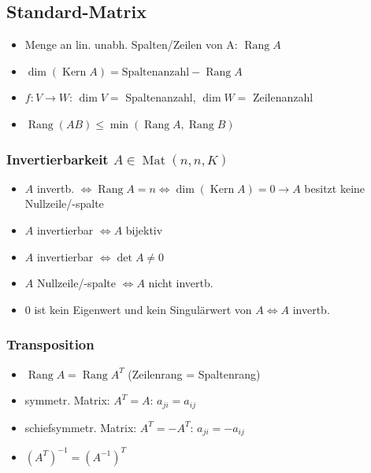 \documentclass[german, fourcolumn, 8pt]{latex4ei/latex4ei_sheet}
\newcommand{\equival}[0]{\ensuremath{\Longleftrightarrow}}
\DeclareMathOperator{\Rang}{Rang}
\DeclareMathOperator{\Kern}{Kern}
\begin{document}
\begin{sectionbox}
    \subsection{Standard-Matrix}
    \begin{itemize}
        \item Menge an lin. unabh. Spalten/Zeilen von A: $\Rang A$
        \item $\dim(\Kern A)= \text{Spaltenanzahl} - \Rang A$
        \item $f: V \rightarrow W$: $\dim V=$ Spaltenanzahl, $\dim W=$ Zeilenanzahl
        \item $\Rang(AB) \le \min(\Rang A, \Rang B)$
    \end{itemize}

    \subsubsection{Invertierbarkeit $A \in \operatorname{Mat}(n,n,K)$}
    \begin{itemize}
        \item $A$ invertb. $\equival \Rang A = n \equival \dim(\Kern A) = 0 \rightarrow A$ besitzt keine Nullzeile/-spalte
        \item $A$ invertierbar $\equival A$ bijektiv
        \item $A$ invertierbar $\equival \det A \ne 0$
        \item $A$ Nullzeile/-spalte $\equival A$ nicht invertb.
        \item $0$ ist kein Eigenwert und kein Singulärwert von $A \equival A$ invertb.
    \end{itemize}

    \subsubsection{Transposition}
    \begin{itemize}
        \item $\Rang A=\Rang A^T$ (Zeilenrang = Spaltenrang)
        \item symmetr. Matrix: $A^T=A$: $a_{ji}=a_{ij}$
        \item schiefsymmetr. Matrix: $A^T=-A^T$: $a_{ji}=-a_{ij}$
        \item $(A^T)^{-1}=(A^{-1})^T$
    \end{itemize}
\end{sectionbox}
\end{document}
